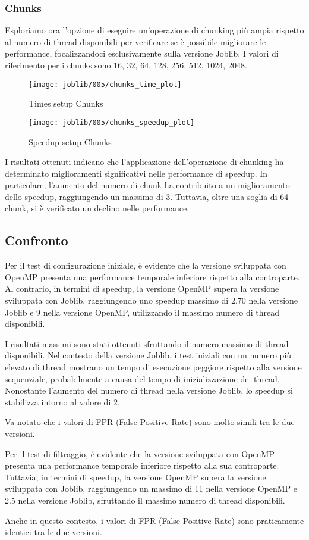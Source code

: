 \subsubsection{Chunks}\label{subsubsec:005-chunks}
Esploriamo ora l'opzione di eseguire un'operazione di chunking più ampia rispetto al numero di thread disponibili per
verificare se è possibile migliorare le performance, focalizzandoci esclusivamente sulla versione Joblib.
I valori di riferimento per i chunks sono 16, 32, 64, 128, 256, 512, 1024, 2048.

\begin{figure}[H]
    \centering
    \texttt{[image: joblib/005/chunks\_time\_plot]}
        \caption{Times setup Chunks}\label{fig:005-chunks_time}
    \endminipage\hfill
    \texttt{[image: joblib/005/chunks\_speedup\_plot]}
        \caption{Speedup setup Chunks}\label{fig:005-chunks_speedup}
    \endminipage\hfill
\end{figure}

I risultati ottenuti indicano che l'applicazione dell'operazione di chunking ha determinato miglioramenti
significativi nelle performance di speedup.
In particolare, l'aumento del numero di chunk ha contribuito a un miglioramento dello speedup,
raggiungendo un massimo di 3.
Tuttavia, oltre una soglia di 64 chunk, si è verificato un declino nelle performance.


\subsection{Confronto}\label{subsec:confronto}
Per il test di configurazione iniziale, è evidente che la versione sviluppata con OpenMP presenta una performance
temporale inferiore rispetto alla controparte.
Al contrario, in termini di speedup, la versione OpenMP supera la versione sviluppata con Joblib,
raggiungendo uno speedup massimo di 2.70 nella versione Joblib e 9 nella versione OpenMP, utilizzando il massimo
numero di thread disponibili.

I risultati massimi sono stati ottenuti sfruttando il numero massimo di thread disponibili.
Nel contesto della versione Joblib, i test iniziali con un numero più elevato di thread mostrano un tempo di esecuzione
peggiore rispetto alla versione sequenziale, probabilmente a causa del tempo di inizializzazione dei thread.
Nonostante l'aumento del numero di thread nella versione Joblib, lo speedup si stabilizza intorno al valore di 2.

Va notato che i valori di FPR (False Positive Rate) sono molto simili tra le due versioni.


Per il test di filtraggio, è evidente che la versione sviluppata con OpenMP presenta una performance temporale
inferiore rispetto alla sua controparte.
Tuttavia, in termini di speedup, la versione OpenMP supera la versione sviluppata con Joblib, raggiungendo un
massimo di 11 nella versione OpenMP e 2.5 nella versione Joblib, sfruttando il massimo numero di thread disponibili.

Anche in questo contesto, i valori di FPR (False Positive Rate) sono praticamente identici tra le due versioni.



